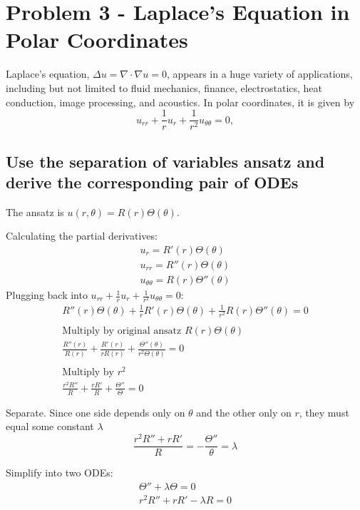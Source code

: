 \documentclass[11pt]{article}
\begin{document}
    \newpage
    
    \section*{Problem 3 - Laplace's Equation in Polar Coordinates}
    \setcounter{subsection}{0}
    Laplace's equation, $\Delta u = \nabla \cdot \nabla u = 0$, appears in a huge variety of applications, including but
    not limited to fluid mechanics, finance, electrostatics, heat conduction, image processing, and acoustics.
    In polar coordinates, it is given by
    \[
        u_{rr} + \frac{1}{r}u_r + \frac{1}{r^2}u_{\theta \theta}=0,
    \]
    \subsection{Use the separation of variables ansatz and derive the corresponding pair of ODEs}

    The ansatz is $u(r,\theta) = R(r) \Theta(\theta)$.

    Calculating the partial derivatives:
    \begin{gather*}
        u_r = R'(r) \Theta(\theta) \\
        u_{rr} = R''(r) \Theta(\theta)\\
        u_{\theta \theta} = R(r) \Theta''(\theta)
    \end{gather*}
    Plugging back into $u_{rr} + \frac{1}{r}u_r + \frac{1}{r^2}u_{\theta \theta}=0$:
    \begin{gather*}
        R''(r) \Theta(\theta) + \frac{1}{r} R'(r)\Theta(\theta) + \frac{1}{r^2} R(r)\Theta''(\theta) = 0\\\\
        \text{Multiply by original ansatz $R(r)\Theta(\theta)$}\\
        \frac{R''(r)}{R(r)} + \frac{R'(r)}{rR(r)} + \frac{\Theta''(\theta)}{r^2\Theta(\theta)} = 0 \\\\
        \text{Multiply by $r^2$}\\
        \frac{r^2R''}{R} + \frac{rR'}{R} + \frac{\Theta''}{\Theta} = 0 \\\\
    \end{gather*}
    Separate.
    Since one side depends only on $\theta$ and the other only on $r$, they must equal some
    constant $\lambda$
    \[
        \frac{r^2R''+rR'}{R}=-\frac{\Theta''}{\theta} = \lambda
    \]

    Simplify into two ODEs:
    \begin{gather*}
        \Theta'' + \lambda \Theta = 0\\
        r^2 R'' + rR' - \lambda R = 0
    \end{gather*}
\end{document}
